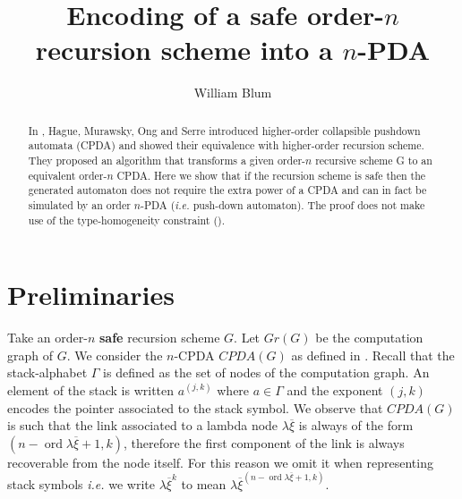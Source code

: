 \documentclass{article}
\author{William Blum}
\title{Encoding of a safe order-$n$ recursion scheme into a $n$-PDA}
\newcommand{\ord}{\mathop{\mathrm{ord}}}
\theoremstyle{remark}
\theoremstyle{definition}
\begin{document}
\maketitle
\begin{abstract}
In \cite{hague-sto07}, Hague, Murawsky, Ong and Serre introduced
higher-order collapsible pushdown automata (CPDA) and showed their
equivalence with higher-order recursion scheme. They proposed an
algorithm that transforms a given order-$n$ recursive  scheme G to
an equivalent order-$n$ CPDA. Here we show that if the recursion
scheme is safe then the generated automaton does not require the
extra power of a CPDA and can in fact be simulated by an order
$n$-PDA ({\it i.e.} push-down automaton). The proof does not make
use of the type-homogeneity constraint (\cite{KNU02}).
\end{abstract}


\section{Preliminaries}

Take an order-$n$ {\bf safe} recursion scheme $G$. Let $Gr(G)$ be the computation graph of $G$.
We consider the $n$-CPDA $CPDA(G)$ as defined in \cite[Definition 5.2]{hague-sto07}.
Recall that the stack-alphabet $\Gamma$ is defined as the set of nodes of the computation graph.
An element of the stack is written $a^{(j,k)}$ where $a\in \Gamma$ and the exponent $(j,k)$
encodes the pointer associated to the stack symbol. We observe that $CPDA(G)$ is such that the link associated to a lambda node $\lambda \overline{\xi}$ is always of the form $(n-\ord{\lambda \overline{\xi}}+1, k)$, therefore the first component of the link is always recoverable from the node itself. For this reason we omit it when representing stack symbols {\it i.e.} we write $\lambda \overline{\xi}^{k}$ to mean $\lambda \overline{\xi}^{(n-\ord{\lambda \overline{\xi}}+1,k)}$.
\end{document}
